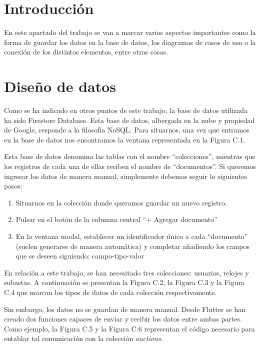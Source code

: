 
\section{Introducción}

	En este apartado del trabajo se van a marcar varios aspectos importantes como la forma de guardar los datos en la base de datos, los diagramas de casos de uso o la conexión de los distintos elementos, entre otras cosas.

\section{Diseño de datos}

	Como se ha indicado en otros puntos de este trabajo, la base de datos utilizada ha sido Firestore Database. Esta base de datos, albergada en la nube y propiedad de Google, responde a la filosofía NoSQL. Para situarnos, una vez que entramos en la base de datos nos encontramos la ventana representada en la Figura C.1.
	

	Esta base de datos denomina las tablas con el nombre ``colecciones'', mientras que los registros de cada una de ellas reciben el nombre de ``documentos''. Si queremos ingresar los datos de manera manual, simplemente debemos seguir lo siguientes pasos:
	\begin{enumerate}
		\item Situarnos en la colección donde queramos guardar un nuevo registro.
		\item Pulsar en el botón de la columna central ``+ Agregar documento''
		\item En la ventana modal, establecer un identificador único a cada ``documento'' (suelen generarse de manera automática) y completar añadiendo los campos que se deseen siguiendo: campo-tipo-valor
	\end{enumerate}
	
	En relación a este trabajo, se han necesitado tres colecciones: usuarios, relojes y subastas. A continuación se presentan la Figura C.2, la Figura C.3 y la Figura C.4 que marcan los tipos de datos de cada colección respectivamente.
	

	Sin embargo, los datos no se guardan de manera manual. Desde Flutter se han creado dos funciones capaces de enviar y recibir los datos entre ambas partes. Como ejemplo, la Figura C.5 y la Figura C.6 representan el código necesario para entablar tal comunicación con la colección \emph{auctions}.
	
